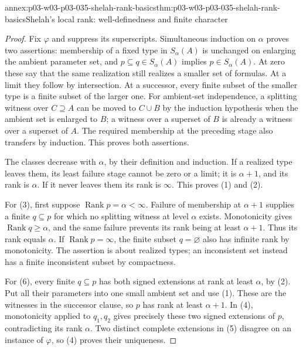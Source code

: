 \begin{annexitem}{annex:p03-w03-p03-035-shelah-rank-basics}{thm:p03-w03-p03-035-shelah-rank-basics}{Shelah's local rank: well-definedness and finite character}
\begin{proof}
Fix \(\varphi\) and suppress its superscripts.  Simultaneous induction on
\(\alpha\) proves two assertions: membership of a fixed type in
\(S_\alpha(A)\) is unchanged on enlarging the ambient parameter set, and
\(p\subseteq q\in S_\alpha(A)\) implies \(p\in S_\alpha(A)\).  At zero
these say that the same realization still realizes a smaller set of
formulas.  At a limit they follow by intersection.  At a successor, every
finite subset of the smaller type is a finite subset of the larger one.
For ambient-set independence, a splitting witness over \(C\supseteq A\)
can be moved to \(C\cup B\) by the induction hypothesis when the ambient
set is enlarged to \(B\); a witness over a superset of \(B\) is already a
witness over a superset of \(A\).  The required membership at the preceding
stage also transfers by induction.  This proves both assertions.

The classes decrease with \(\alpha\), by their definition and induction.
If a realized type leaves them, its least failure stage cannot be zero or
a limit; it is \(\alpha+1\), and its rank is \(\alpha\).  If it never
leaves them its rank is \(\infty\).  This proves (1) and (2).

For (3), first suppose \(\operatorname{Rank}p=\alpha<\infty\).  Failure
of membership at \(\alpha+1\) supplies a finite \(q\subseteq p\) for which
no splitting witness at level \(\alpha\) exists.  Monotonicity gives
\(\operatorname{Rank}q\geq\alpha\), and the same failure prevents its rank
being at least \(\alpha+1\).  Thus its rank equals \(\alpha\).  If
\(\operatorname{Rank}p=\infty\), the finite subset \(q=\varnothing\) also
has infinite rank by monotonicity.  The assertion is about realized types;
an inconsistent set instead has a finite inconsistent subset by compactness.

For (6), every finite \(q\subseteq p\) has both signed extensions at rank
at least \(\alpha\), by (2).  Put all their parameters into one small
ambient set and use (1).  These are the witnesses in the successor clause,
so \(p\) has rank at least \(\alpha+1\).  In (4), monotonicity applied to
\(q_1,q_2\) gives precisely these two signed extensions of \(p\),
contradicting its rank \(\alpha\).  Two distinct complete extensions in
(5) disagree on an instance of \(\varphi\), so (4) proves their uniqueness.
\end{proof}
\end{annexitem}

